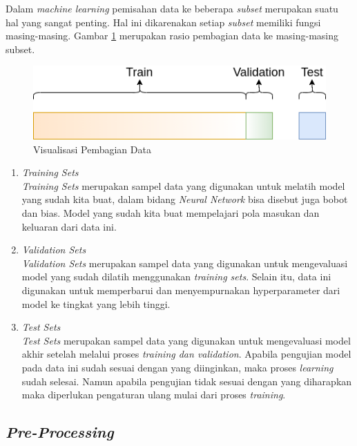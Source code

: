 \documentclass[conference]{IEEEtran}
\begin{document}
	\vspace{1ex}
	Dalam \textit{machine learning} pemisahan data ke beberapa \textit{subset} merupakan suatu hal yang sangat penting. Hal ini dikarenakan setiap \textit{subset} memiliki fungsi masing-masing. Gambar \ref{fig:data-splitting} merupakan rasio pembagian data ke masing-masing subset.
	
	\begin{figure}[h]
		\centering
		\includegraphics[scale=0.5]{img/data-splitting.png}
		\caption{Visualisasi Pembagian Data}
		\label{fig:data-splitting}
	\end{figure}
	
	\begin{enumerate}
		\item \textit{Training Sets}\\
		\textit{Training Sets} merupakan sampel data yang digunakan untuk melatih model yang sudah kita buat, dalam bidang \textit{Neural Network} bisa disebut juga bobot dan bias. Model yang sudah kita buat mempelajari pola masukan dan keluaran dari data ini. 
		
		\item \textit{Validation Sets}\\
		\textit{Validation Sets} merupakan sampel data yang digunakan untuk mengevaluasi model yang sudah dilatih menggunakan \textit{training sets}. Selain itu, data ini digunakan untuk memperbarui dan menyempurnakan hyperparameter dari model ke tingkat yang lebih tinggi.
		
		\item\textit{Test Sets}\\
		\textit{Test Sets} merupakan sampel data yang digunakan untuk mengevaluasi model akhir setelah melalui proses \textit{training dan validation}. Apabila pengujian model pada data ini sudah sesuai dengan yang diinginkan, maka proses \textit{learning} sudah selesai. Namun apabila pengujian tidak sesuai dengan yang diharapkan maka diperlukan pengaturan ulang mulai dari proses \textit{training}. 
	\end{enumerate} 
	
	\subsection{\textit{Pre-Processing}}
	\vspace{1ex}
	
\end{document}
